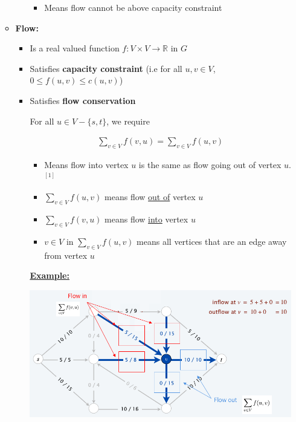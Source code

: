\documentclass[12pt]{article}
\begin{document}
\begin{enumerate}[1.]
\begin{itemize}
\begin{itemize}
            \begin{itemize}
                \item Means flow cannot be above capacity constraint
            \end{itemize}
        \end{itemize}

        \item \textbf{Flow:}

        \begin{itemize}
            \item Is a real valued function $f: V \times V \to \mathbb{R}$ in $G$
            \item Satisfies \textbf{capacity constraint} (i.e for all $u,v \in V$, $0 \leq f(u,v) \leq c(u,v)$)
            \item Satisfies \textbf{flow conservation}

            \bigskip

            For all $u \in V - \{s,t\}$, we require

            \bigskip

            \begin{align}
            \sum\limits_{v \in V} f(v,u) = \sum\limits_{v \in V} f(u,v)
            \end{align}

            \bigskip

            \begin{itemize}
                \item Means flow into vertex $u$ is the same as flow going out of vertex $u$. $^{[1]}$
                \item $\sum\limits_{v \in V} f(u,v)$ means flow \underline{out of} vertex $u$
                \item $\sum\limits_{v \in V} f(v,u)$ means flow \underline{into} vertex $u$
                \item $v \in V$ in $\sum\limits_{v \in V} f(u,v)$ means all vertices that are an edge away from vertex $u$
            \end{itemize}

            \bigskip

            \underline{\textbf{Example:}}

            \begin{center}
            \includegraphics[width=0.9\linewidth]{images/worksheet_5_solution_4.png}
            \end{center}



\end{itemize}
\end{itemize}
\end{enumerate}
\end{document}
